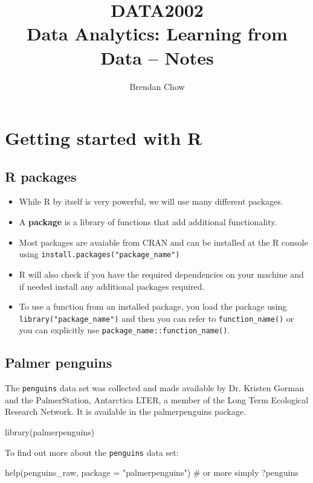 \documentclass[a4paper]{article}\usepackage[]{graphicx}\usepackage[]{xcolor}
\begin{document}
	\title{{DATA2002}\\{\normalsize{Data Analytics: Learning from Data -- Notes}}}
	\author{Brendan Chow}
	\maketitle
	\newpage
	\pagestyle{fancynotes}
\section{Getting started with R}\label{sec:1}
\subsection{R packages}
\begin{itemize}
	\item While R by itself is very powerful, we will use many different packages.
	\item A \textbf{package} is a library of functions that add additional functionality.
	\item Most packages are avaiable from CRAN and can be installed at the R console using \lstinline|install.packages("package_name")|
	\item R will also check if you have the required dependencies on your machine and if needed install any additional packages required.
	\item To use a function from an installed package, you load the package using \lstinline|library("package_name")| and then you can refer to \lstinline|function_name()| or you can explicitly use \lstinline|package_name::function_name()|.
\end{itemize}
\subsection{Palmer penguins}
The \lstinline|penguins| data set was collected and made available by Dr. Kristen Gorman and the PalmerStation, Antarctica LTER, a member of the Long Term Ecological Research Network.
It is available in the palmerpenguins package.
\begin{Schunk}
\begin{Sinput}
library(palmerpenguins)
\end{Sinput}
\end{Schunk}
To find out more about the \lstinline|penguins| data set:
\begin{Schunk}
\begin{Sinput}
help(penguins_raw, package = "palmerpenguins")
# or more simply
?penguins
\end{Sinput}
\end{Schunk}
\end{document}
